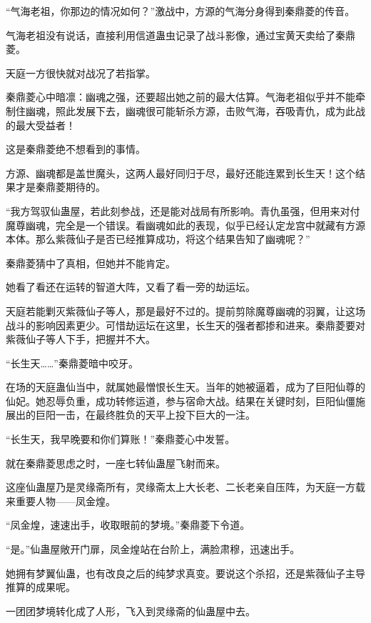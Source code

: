 
\begin{this_body}

“气海老祖，你那边的情况如何？”激战中，方源的气海分身得到秦鼎菱的传音。

气海老祖没有说话，直接利用信道蛊虫记录了战斗影像，通过宝黄天卖给了秦鼎菱。

天庭一方很快就对战况了若指掌。

秦鼎菱心中暗凛：幽魂之强，还要超出她之前的最大估算。气海老祖似乎并不能牵制住幽魂，照此发展下去，幽魂很可能斩杀方源，击败气海，吞吸青仇，成为此战的最大受益者！

这是秦鼎菱绝不想看到的事情。

方源、幽魂都是盖世魔头，这两人最好同归于尽，最好还能连累到长生天！这个结果才是秦鼎菱期待的。

“我方驾驭仙蛊屋，若此刻参战，还是能对战局有所影响。青仇虽强，但用来对付魔尊幽魂，完全是一个错误。看幽魂如此的表现，似乎已经认定龙宫中就藏有方源本体。那么紫薇仙子是否已经推算成功，将这个结果告知了幽魂呢？”

秦鼎菱猜中了真相，但她并不能肯定。

她看了看还在运转的智道大阵，又看了看一旁的劫运坛。

天庭若能剿灭紫薇仙子等人，那是最好不过的。提前剪除魔尊幽魂的羽翼，让这场战斗的影响因素更少。可惜劫运坛在这里，长生天的强者都掺和进来。秦鼎菱要对紫薇仙子等人下手，把握并不大。

“长生天……”秦鼎菱暗中咬牙。

在场的天庭蛊仙当中，就属她最憎恨长生天。当年的她被逼着，成为了巨阳仙尊的仙妃。她忍辱负重，成功转修运道，参与宿命大战。结果在关键时刻，巨阳仙僵施展出的巨阳一击，在最终胜负的天平上投下巨大的一注。

“长生天，我早晚要和你们算账！”秦鼎菱心中发誓。

就在秦鼎菱思虑之时，一座七转仙蛊屋飞射而来。

这座仙蛊屋乃是灵缘斋所有，灵缘斋太上大长老、二长老亲自压阵，为天庭一方载来重要人物——凤金煌。

“凤金煌，速速出手，收取眼前的梦境。”秦鼎菱下令道。

“是。”仙蛊屋敞开门扉，凤金煌站在台阶上，满脸肃穆，迅速出手。

她拥有梦翼仙蛊，也有改良之后的纯梦求真变。要说这个杀招，还是紫薇仙子主导推算的成果呢。

一团团梦境转化成了人形，飞入到灵缘斋的仙蛊屋中去。


\end{this_body}
